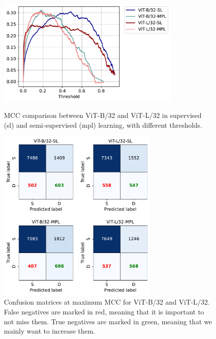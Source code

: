 \begin{figure}[p]
    \centering
    \includegraphics[width=0.8\textwidth]{images/bdd100k/training/mcc_comp.pdf}
    \caption[MCC comparison between ViT-B/32 and ViT-L/32]
    {MCC comparison between ViT-B/32 and ViT-L/32 in supervised (\acs{sl}) and semi-supervised 
    (\acs{mpl}) learning, with different thresholds.}
    \label{fig:mcc}
    \vspace{1cm}
    \includegraphics[width=0.7\textwidth]{images/bdd100k/training/confusion-matrix_comp.pdf}
    \caption[Confusion matrices at maximum MCC]
    {Confusion matrices at maximum MCC for ViT-B/32 and ViT-L/32.
    False negatives are marked in red, meaning that it is important to not miss 
    them. True negatives are marked in green, meaning that we mainly want to 
    increase them.}
    \label{fig:confusion_matrix_max_mcc}
\end{figure}

